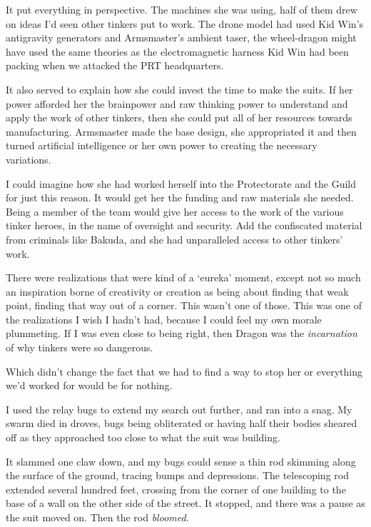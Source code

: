 It put everything in perspective.  The machines she was using, half of them drew on ideas I'd seen other tinkers put to work.  The drone model had used Kid Win's antigravity generators and Armsmaster's ambient taser, the wheel-dragon might have used the same theories as the electromagnetic harness Kid Win had been packing when we attacked the PRT headquarters.



It also served to explain how she could invest the time to make the suits.  If her power afforded her the brainpower and raw thinking power to understand and apply the work of other tinkers, then she could put all of her resources towards manufacturing.  Armsmaster made the base design, she appropriated it and then turned artificial intelligence or her own power to creating the necessary variations.



I could imagine how she had worked herself into the Protectorate and the Guild for just this reason.  It would get her the funding and raw materials she needed.  Being a member of the team would give her access to the work of the various tinker heroes, in the name of oversight and security.  Add the confiscated material from criminals like Bakuda, and she had unparalleled access to other tinkers' work.



There were realizations that were kind of a `eureka' moment, except not so much an inspiration borne of creativity or creation as being about finding that weak point, finding that way out of a corner.  This wasn't one of those.  This was one of the realizations I wish I hadn't had, because I could feel my own morale plummeting.  If I was even close to being right, then Dragon was the \emph{incarnation} of why tinkers were so dangerous.



Which didn't change the fact that we had to find a way to stop her or everything we'd worked for would be for nothing.



I used the relay bugs to extend my search out further, and ran into a snag.  My swarm died in droves, bugs being obliterated or having half their bodies sheared off as they approached too close to what the suit was building.



It slammed one claw down, and my bugs could sense a thin rod skimming along the surface of the ground, tracing bumps and depressions.   The telescoping rod extended several hundred feet, crossing from the corner of one building to the base of a wall on the other side of the street.  It stopped, and there was a pause as the suit moved on.  Then the rod \emph{bloomed}.



